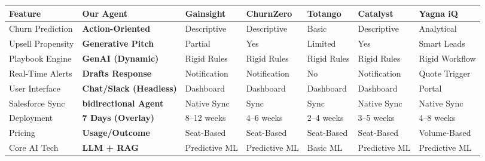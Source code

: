 \documentclass[12pt,a4paper]{article}
\begin{document}
\begin{longtable}{|p{2.2cm}|p{2.8cm}|p{1.7cm}|p{1.7cm}|p{1.5cm}|p{1.7cm}|p{2.2cm}|}
\hline
\textbf{Feature} & \textbf{Our Agent} & \textbf{Gainsight} & \textbf{ChurnZero} & \textbf{Totango} & \textbf{Catalyst} & \textbf{Yagna iQ} \\
\hline
Churn Prediction & \textbf{Action-Oriented} & Descriptive & Descriptive & Basic & Descriptive & Analytical \\
\hline
Upsell Propensity & \textbf{Generative Pitch} & Partial & Yes & Limited & Yes & Smart Leads \\
\hline
Playbook Engine & \textbf{GenAI (Dynamic)} & Rigid Rules & Rigid Rules & Rigid Rules & Rigid Rules & Rigid Workflow \\
\hline
Real-Time Alerts & \textbf{Drafts Response} & Notification & Notification & No & Notification & Quote Trigger \\
\hline
User Interface & \textbf{Chat/Slack (Headless)} & Dashboard & Dashboard & Dashboard & Dashboard & Portal \\
\hline
Salesforce Sync & \textbf{ bidirectional Agent} & Native Sync & Sync & Sync & Native Sync & Native Sync \\
\hline
Deployment & \textbf{7 Days (Overlay)} & 8--12 weeks & 4--6 weeks & 2--4 weeks & 3--5 weeks & 4--8 weeks \\
\hline
Pricing & \textbf{Usage/Outcome} & Seat-Based & Seat-Based & Seat-Based & Seat-Based & Volume-Based \\
\hline
Core AI Tech & \textbf{LLM + RAG} & Predictive ML & Predictive ML & Basic ML & Predictive ML & Predictive ML \\
\hline
\end{longtable}
\normalsize
\end{document}
